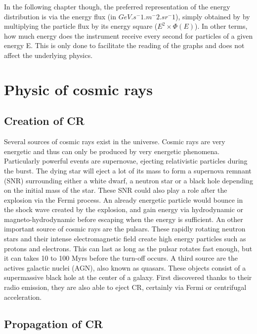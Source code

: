 In the following chapter though, the preferred representation of the energy distribution is via the energy flux (in $GeV.s^-1.m^-2.sr^-1$), simply obtained by by multiplying the particle flux by its energy square ($E^2 \times \Phi(E)$). In other terms, how much energy does the instrument receive every second for particles of a given energy E. This is only done to facilitate the reading of the graphs and does not affect the underlying physics.



\section{Physic of cosmic rays}

\subsection{Creation of CR}
\label{sec:creation_of_CRs}

Several sources of cosmic rays exist in the universe. Cosmic rays are very energetic and thus can only be produced by very energetic phenomena. Particularly powerful events are supernovae, ejecting relativistic particles during the burst. The dying star will eject a lot of its mass to form a supernova remnant (SNR) surrounding either a white dwarf, a neutron star or a black hole depending on the initial mass of the star. These SNR could also play a role after the explosion via the Fermi process. An already energetic particle would bounce in the shock wave created by the explosion, and gain energy via hydrodynamic or magneto-hydrodynamic before escaping when the energy is sufficient.
An other important source of cosmic rays are the pulsars. These rapidly rotating neutron stars and their intense electromagnetic field create high energy particles such as protons and electrons. This can last as long as the pulsar rotates fast enough, but it can takes 10 to 100 Myrs before the turn-off occurs.
A third source are the actives galactic nuclei (AGN), also known as quasars. These objects consist of a supermassive black hole at the center of a galaxy. First discovered thanks to their radio emission, they are also able to eject CR, certainly via Fermi or centrifugal acceleration.


\subsection{Propagation of CR}

